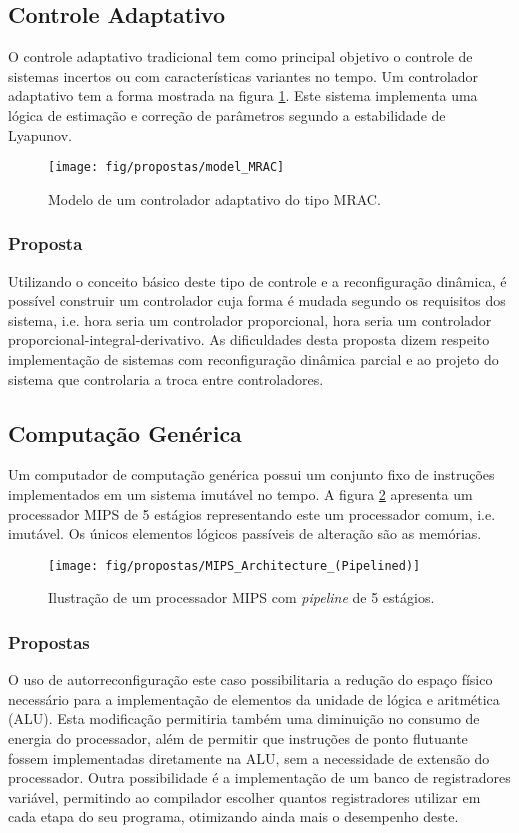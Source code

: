 \subsection{Controle Adaptativo}
O controle adaptativo tradicional tem como principal objetivo o controle de sistemas incertos ou com características variantes no tempo.
Um controlador adaptativo tem a forma mostrada na figura \ref{fig:cadapt}.
Este sistema implementa uma l\'ogica de estima\c{c}\~ao e corre\c{c}\~ao de parâmetros segundo a estabilidade de Lyapunov.

\begin{figure}[h]
\centering
\texttt{[image: fig/propostas/model\_MRAC]}
\caption{Modelo de um controlador adaptativo do tipo MRAC.}
\label{fig:cadapt}
\end{figure}

\subsubsection{Proposta}
Utilizando o conceito básico deste tipo de controle e a reconfiguração dinâmica, é possível construir um controlador cuja forma é mudada segundo os requisitos dos sistema, i.e. hora seria um controlador proporcional, hora seria um controlador proporcional-integral-derivativo.
As dificuldades desta proposta dizem respeito implementa\c{c}\~ao de sistemas com reconfigura\c{c}\~ao dinâmica parcial e ao projeto do sistema que controlaria a troca entre controladores.

\subsection{Computação Genérica}
Um computador de computação genérica possui um conjunto fixo de instruções implementados em um sistema imutável no tempo.
A figura \ref{fig:mips} apresenta um processador MIPS de 5 estágios representando este um processador comum, i.e. imutável.
Os únicos elementos lógicos passíveis de alteração são as memórias.

\begin{figure}[h]
\centering
\texttt{[image: fig/propostas/MIPS\_Architecture\_(Pipelined)]}
\caption{Ilustração de um processador MIPS com \textit{pipeline} de 5 estágios.}
\label{fig:mips}
\end{figure}

\subsubsection{Propostas}
O uso de autorreconfiguração este caso possibilitaria a redução do espaço físico necessário para a implementação de elementos da unidade de lógica e aritmética (ALU).
Esta modificação permitiria também uma diminuição no consumo de energia do processador, além de permitir que instruções de ponto flutuante fossem implementadas diretamente na ALU, sem a necessidade de extensão do processador.
Outra possibilidade é a implementação de um banco de registradores variável, permitindo ao compilador escolher quantos registradores utilizar em cada etapa do seu programa, otimizando ainda mais o desempenho deste.

